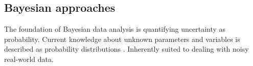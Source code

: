 















\subsection{Bayesian approaches}\label{bayesian-approaches}

The foundation of Bayesian data analysis is quantifying uncertainty as
probability. Current knowledge about unknown parameters and variables is
described as probability distributions \citep{Gelman2013}.
Inherently suited to dealing with noisy real-world data.


